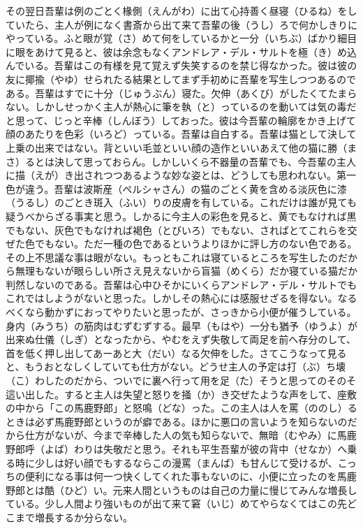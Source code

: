 \documentclass{book}
\begin{document}
その翌日吾輩は例のごとく椽側（えんがわ）に出て心持善く昼寝（ひるね）をしていたら、主人が例になく書斎から出て来て吾輩の後（うし）ろで何かしきりにやっている。ふと眼が覚（さ）めて何をしているかと一分（いちぶ）ばかり細目に眼をあけて見ると、彼は余念もなくアンドレア・デル・サルトを極（き）め込んでいる。吾輩はこの有様を見て覚えず失笑するのを禁じ得なかった。彼は彼の友に揶揄（やゆ）せられたる結果としてまず手初めに吾輩を写生しつつあるのである。吾輩はすでに十分（じゅうぶん）寝た。欠伸（あくび）がしたくてたまらない。しかしせっかく主人が熱心に筆を執（と）っているのを動いては気の毒だと思って、じっと辛棒（しんぼう）しておった。彼は今吾輩の輪廓をかき上げて顔のあたりを色彩（いろど）っている。吾輩は自白する。吾輩は猫として決して上乗の出来ではない。背といい毛並といい顔の造作といいあえて他の猫に勝（まさ）るとは決して思っておらん。しかしいくら不器量の吾輩でも、今吾輩の主人に描（えが）き出されつつあるような妙な姿とは、どうしても思われない。第一色が違う。吾輩は波斯産（ペルシャさん）の猫のごとく黄を含める淡灰色に漆（うるし）のごとき斑入（ふい）りの皮膚を有している。これだけは誰が見ても疑うべからざる事実と思う。しかるに今主人の彩色を見ると、黄でもなければ黒でもない、灰色でもなければ褐色（とびいろ）でもない、さればとてこれらを交ぜた色でもない。ただ一種の色であるというよりほかに評し方のない色である。その上不思議な事は眼がない。もっともこれは寝ているところを写生したのだから無理もないが眼らしい所さえ見えないから盲猫（めくら）だか寝ている猫だか判然しないのである。吾輩は心中ひそかにいくらアンドレア・デル・サルトでもこれではしようがないと思った。しかしその熱心には感服せざるを得ない。なるべくなら動かずにおってやりたいと思ったが、さっきから小便が催うしている。身内（みうち）の筋肉はむずむずする。最早（もはや）一分も猶予（ゆうよ）が出来ぬ仕儀（しぎ）となったから、やむをえず失敬して両足を前へ存分のして、首を低く押し出してあーあと大（だい）なる欠伸をした。さてこうなって見ると、もうおとなしくしていても仕方がない。どうせ主人の予定は打（ぶ）ち壊（こ）わしたのだから、ついでに裏へ行って用を足（た）そうと思ってのそのそ這い出した。すると主人は失望と怒りを掻（か）き交ぜたような声をして、座敷の中から「この馬鹿野郎」と怒鳴（どな）った。この主人は人を罵（ののし）るときは必ず馬鹿野郎というのが癖である。ほかに悪口の言いようを知らないのだから仕方がないが、今まで辛棒した人の気も知らないで、無暗（むやみ）に馬鹿野郎呼（よば）わりは失敬だと思う。それも平生吾輩が彼の背中（せなか）へ乗る時に少しは好い顔でもするならこの漫罵（まんば）も甘んじて受けるが、こっちの便利になる事は何一つ快くしてくれた事もないのに、小便に立ったのを馬鹿野郎とは酷（ひど）い。元来人間というものは自己の力量に慢じてみんな増長している。少し人間より強いものが出て来て窘（いじ）めてやらなくてはこの先どこまで増長するか分らない。
\end{document}
